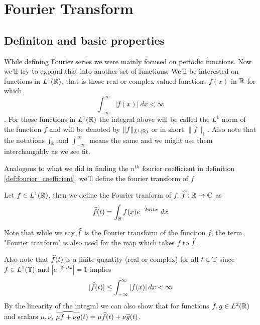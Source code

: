 \newpage
\section{Fourier Transform}

\subsection{Definiton and basic properties}
  While defining Fourier series we were mainly focused on periodic functions. Now we'll try to expand that into another set of functions. We'll be interested on functions in $L^1(\mathbb R)$, that is those real or complex valued functions $f(x)$ in $\mathbb R$ for which $$\int_{-\infty}^{\infty} |f(x)| \ dx < \infty$$. For those functions in $L^1(\mathbb R)$ the integral above will be called the $L^1$ norm of the function $f$ and will be denoted by $\|f\|_{L^1(\mathbb R)}$ or in short $\|f\|_1$. Also note that the notations $\int_{\mathbb R}$ and $\int_{-\infty}^{\infty}$ means the same and we might use them interchangably as we see fit.

  Analogous to what we did in finding the $n^{th}$ fourier coefficient in definition \ref{def:fourier_coefficient}, we'll define the fourier transform of $f$

  \begin{definition}
    \label{def:fourier_transform_of_f}
    Let $f \in L^1(\mathbb R)$, then we define the Fourier tranform of $f$, $\widehat{f} : \mathbb R \to \mathbb C$ as $$\hatf(t) = \int_{\R} f(x) e^{-2 \pi itx} \ dx$$
  \end{definition}
  Note that while we say $\widehat{f}$ is the Fourier transform of the function $f$, the term "Fourier tranform" is also used for the map which takes $f$ to $\widehat{f}$.

  Also note that $\widehat{f}(t)$ is a finite quantity (real or complex) for all $t \in \mathbb T$ since $f\in L^1(\mathbb T)$ and $|e^{-2 \pi itx}| = 1$ implies $$|\widehat{f}(t)| \le \int_{-\infty}^{\infty}\left|f(x)\right| dx < \infty$$ By the linearity of the integral we can also show that for functions $f, g \in L^2(\mathbb R)$ and scalars $\mu, \nu$, $\widehat{\mu f + \nu g}(t) = \mu \widehat{f}(t) + \nu\widehat{g}(t)$.


